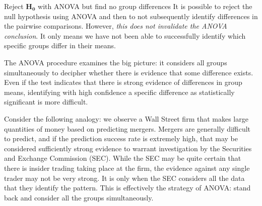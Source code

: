 \begin{onebox}{Reject $\mathbf{H_0}$ with ANOVA
    but find no group differences}
  It is possible to reject the null hypothesis using ANOVA
  and then to not subsequently identify differences in the
  pairwise comparisons.
  However, \emph{this does not invalidate the ANOVA conclusion}.
  It only means we have not been able to successfully identify
  which specific groups differ in their means.
\end{onebox}

The ANOVA procedure examines the big picture: it considers all groups simultaneously to decipher whether there is evidence that some difference exists. Even if the test indicates that there is strong evidence of differences in group means, identifying with high confidence a specific difference as statistically significant is more difficult.

Consider the following analogy: we observe a Wall Street firm that makes large quantities of money based on predicting mergers. Mergers are generally difficult to predict, and if the prediction success rate is extremely high, that may be considered sufficiently strong evidence to warrant investigation by the Securities and Exchange Commission (SEC). While the SEC may be quite certain that there is insider trading taking place at the firm, the evidence against any single trader may not be very strong. It is only when the SEC considers all the data that they identify the pattern. This is effectively the strategy of ANOVA: stand back and consider all the groups simultaneously.


